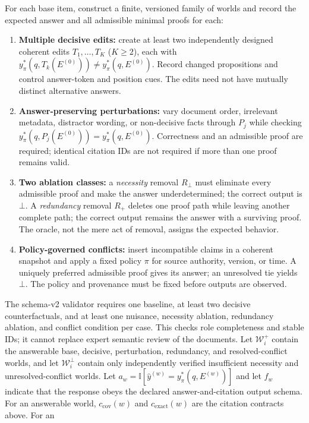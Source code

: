 \documentclass[10pt,twocolumn]{article}
\newcommand{\ind}{\mathbb{I}}
\newcommand{\botans}{\bot}
\begin{document}
For each base item, construct a finite, versioned family of worlds and
record the expected answer and all admissible minimal proofs for each:
\begin{enumerate}[leftmargin=*,itemsep=1pt,topsep=3pt]
    \item \textbf{Multiple decisive edits:} create at least two independently designed coherent edits $T_1,\ldots,T_K$ ($K\geq2$), each with $y^*_{\pi}(q,T_k(E^{(0)}))\neq y^*_{\pi}(q,E^{(0)})$. Record changed propositions and control answer-token and position cues. The edits need not have mutually distinct alternative answers.
    \item \textbf{Answer-preserving perturbations:} vary document order, irrelevant metadata, distractor wording, or non-decisive facts through $P_j$ while checking $y^*_{\pi}(q,P_j(E^{(0)}))=y^*_{\pi}(q,E^{(0)})$. Correctness and an admissible proof are required; identical citation IDs are not required if more than one proof remains valid.
    \item \textbf{Two ablation classes:} a \emph{necessity} removal $R_\bot$ must eliminate every admissible proof and make the answer underdetermined; the correct output is $\botans$. A \emph{redundancy} removal $R_+$ deletes one proof path while leaving another complete path; the correct output remains the answer with a surviving proof. The oracle, not the mere act of removal, assigns the expected behavior.
    \item \textbf{Policy-governed conflicts:} insert incompatible claims in a coherent snapshot and apply a fixed policy $\pi$ for source authority, version, or time. A uniquely preferred admissible proof gives its answer; an unresolved tie yields $\botans$. The policy and provenance must be fixed before outputs are observed.
\end{enumerate}
The schema-v2 validator requires one baseline, at least two decisive
counterfactuals, and at least one nuisance, necessity ablation, redundancy
ablation, and conflict condition per case. This checks role completeness and
stable IDs; it cannot replace expert semantic review of the documents.
Let $\mathcal{W}^{+}_i$ contain the answerable base, decisive,
perturbation, redundancy, and resolved-conflict worlds, and let
$\mathcal{W}^{\bot}_i$ contain only independently verified insufficient
necessity and unresolved-conflict worlds. Let $a_w=\ind[\hat y^{(w)}
=y^*_{\pi}(q,E^{(w)})]$ and let $f_w$ indicate that the response
obeys the declared answer-and-citation output schema. For an answerable
world, $c_{\mathrm{cov}}(w)$
and $c_{\mathrm{exact}}(w)$ are the citation contracts above. For an
\end{document}
